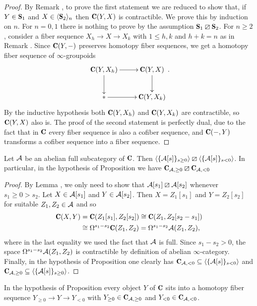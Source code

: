 \begin{proof}
By Remark , to prove the first statement we are reduced to show that, if $Y\in \cate{S}_1$ and $X\in \langle\cate{S}_2\rangle_n$ then $\C(Y,X)$ is contractible. We prove this by induction on $n$. For $n=0,1$ there is nothing to prove by the assumption $\cate{S}_1\orth \cate{S}_2$. For $n\geq 2$, consider a fiber sequence $X_h\to X\to X_k$ with $1\leq h,k$ and $h+k=n$ as in Remark . Since $\C(Y,-)$ preserves homotopy fiber sequences, we get a homotopy fiber sequence of $\infty$-groupoids
\[
\xymatrix{
\C(Y,X_h)\ar[r]\ar[d]& \C(Y,X)\ar[d]\\
{*}\ar[r] &\C(Y,X_k)
}.
\]
By the inductive hypothesis both $\C(Y,X_h)$ and $\C(Y,X_k)$ are contractible, so $\C(Y,X)$ also is. The proof of the second statement is perfectly dual, due to the fact that in $\C$ every fiber sequence is also a cofiber sequence, and $\C(-,Y)$ transforms a cofiber sequence into a fiber sequence.
\end{proof}
\begin{lemma}\label{uno}
Let $\mathcal{A}$ be an abelian full subcategory of $\C$. Then $\langle \{\mathcal{A}[s]\}_{s\geq 0}\rangle\boxslash \langle \{\mathcal{A}[s]\}_{s<0}\rangle$. In particular, in the hypothesis of Proposition  we have $\C_{\A,\geq 0}\orth \C_{\A,<0}$
\end{lemma}
\begin{proof}
By Lemma , we only need to show that $\mathcal{A}[s_1]\boxslash \mathcal{A}[s_2]$ whenever $s_1\geq 0> s_2$. Let $X\in \mathcal{A}[s_1]$ and $Y\in\mathcal{A}[s_2]$. Then $X=Z_1[s_1]$ and $Y=Z_2[s_2]$ for suitable $Z_1,Z_2\in \mathcal{A}$ and so 
\begin{align*}
\C(X,Y)&=\C(Z_1[s_1],Z_2[s_2])\cong  \C(Z_1,Z_2[s_2-s_1])\\
&\cong \Omega^{s_1-s_2}\C(Z_1,Z_2)=\Omega^{s_1-s_2}\A(Z_1,Z_2),
\end{align*}
where in the last equality we used the fact that $\mathcal{A}$ is full. Since $s_1-s_2>0$, the space $\Omega^{s_1-s_2}\mathcal{A}(Z_1,Z_2)$ is contractible by definition of abelian $\infty$-category.
Finally, in the hypothesis of Proposition   one clearly has $\C_{\A,< 0}\subseteq \langle \{\A[s]\}_{s<0}\rangle$ and $\C_{\A,\geq 0}\subseteq \langle \{\A[s]\}_{s\geq 0}\rangle$.
\end{proof}
\begin{lemma}\label{due}
In the hypothesis of Proposition  every object $Y$ of $\C$ sits into a homotopy fiber sequence $Y_{\geq 0}\to Y\to Y_{<0}$ with $Y_{\geq 0}\in \C_{\A,\geq 0}$ and $Y_{< 0}\in \C_{\A,< 0}$.
\end{lemma}
